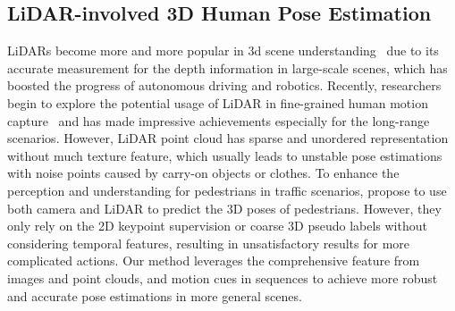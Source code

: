 \documentclass[letterpaper]{article} %
\begin{document}
\subsection{LiDAR-involved 3D Human Pose Estimation}
LiDARs become more and more popular in 3d scene understanding~\cite{Cong_2022_CVPR,Zhu2020SSNSS,zhu2021cylindrical,Yin2020Centerbased3O,han2022licamgait} due to its accurate measurement for the depth information in large-scale scenes, which has boosted the progress of autonomous driving and robotics. Recently, researchers begin to explore the potential usage of LiDAR in fine-grained human motion capture~\cite{Li2022LiDARCapLM,Zhao2022LiDARaidIP} and has made impressive achievements especially for the long-range scenarios. However, LiDAR point cloud has sparse and unordered representation without much texture feature, which usually leads to unstable pose estimations with noise points caused by carry-on objects or clothes. To enhance the perception and understanding for pedestrians in traffic scenarios, \cite{furst2021hperl,zheng2022multi} propose to use both camera and LiDAR to predict the 3D poses of pedestrians. However, they only rely on the 2D keypoint supervision or coarse 3D pseudo labels without considering temporal features, resulting in unsatisfactory results for more complicated actions. Our method leverages the comprehensive feature from images and point clouds, and motion cues in sequences to achieve more robust and accurate pose estimations in more general scenes.
\end{document}
